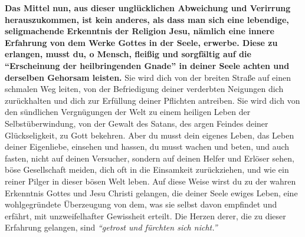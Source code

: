 \textbf{Das Mittel nun, aus dieser unglücklichen Abweichung und Verirrung
herauszukommen,
ist kein anderes, als dass man sich eine lebendige, seligmachende Erkenntnis der
Religion Jesu, nämlich eine innere Erfahrung von dem
Werke Gottes in der Seele,
erwerbe. Diese zu erlangen, musst du, o Mensch, fleißig und sorgfältig auf die
"`Erscheinung der heilbringenden Gnade"'
in deiner Seele
achten und derselben Gehorsam leisten.} Sie wird dich von der breiten Straße auf
einen schmalen Weg leiten, von der Befriedigung deiner verderbten Neigungen dich
zurückhalten und dich zur Erfüllung deiner Pflichten antreiben.
Sie wird dich
von den sündlichen Vergnügungen der Welt zu einem
heiligen Leben der
Selbstüberwindung, von der Gewalt des Satans, des argen Feindes
deiner
Glückseligkeit, zu Gott bekehren. Aber du musst dein
eigenes Leben, das Leben
deiner Eigenliebe, einsehen und hassen,
du musst wachen und beten, und auch fasten, nicht auf
deinen Versucher,
sondern auf deinen Helfer und Erlöser sehen, böse
Gesellschaft meiden, dich oft
in die Einsamkeit zurückziehen, und wie ein reiner
Pilger in dieser bösen Welt
leben. Auf diese Weise wirst du zu der wahren Erkenntnis
Gottes und Jesu Christi
gelangen, die deiner Seele ewiges Leben, eine wohlgegründete
Überzeugung von
dem, was sie selbst davon empfindet und erfährt, mit unzweifelhafter Gewissheit
erteilt. Die Herzen derer, die zu dieser Erfahrung gelangen, sind
\textit{"`getrost und fürchten sich nicht."'}



